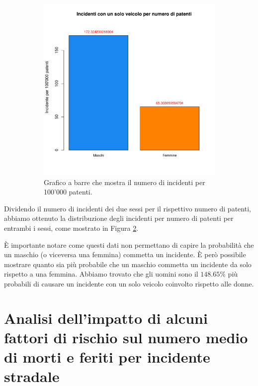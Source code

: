 \documentclass[12pt,a4paper,final,oneside]{article}			%
\begin{document}
\begin{figure}[h]
\begin{subfigure}{0.5\textwidth}
                \includegraphics[scale=0.5]{../results/incidenti_per_sesso_per_patenti.pdf}
                \caption{Grafico a barre che mostra il numero di incidenti per 100’000 patenti. }
                \label{Fig: incidenti_per_sesso_patenti}
            \end{subfigure}
            \caption{}
        \end{figure}
        
        Dividendo il numero di incidenti dei due sessi per il rispettivo numero di patenti, abbiamo ottenuto la distribuzione degli incidenti per numero di patenti per entrambi i sessi, come mostrato in Figura \ref{Fig: incidenti_per_sesso_patenti}.
        
        È importante notare come questi dati non permettano di capire la probabilità che un maschio (o viceversa una femmina) commetta un incidente. È però possibile mostrare quanto sia più probabile che un maschio commetta un incidente da solo rispetto a una femmina. Abbiamo trovato che gli uomini sono il $148.65\%$ più probabili di causare un incidente con un solo veicolo coinvolto rispetto alle donne.
\clearpage

\section{Analisi dell’impatto di alcuni fattori di rischio sul numero medio di morti e feriti per incidente stradale}
    
\end{document}
